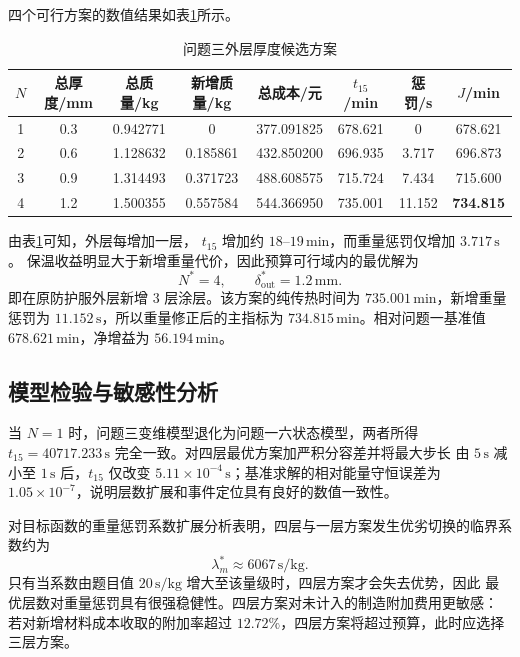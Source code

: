 \documentclass[withoutpreface,bwprint]{cumcmthesis}
\begin{document}
四个可行方案的数值结果如表\ref{tab:q3-candidates}所示。
\begin{table}[H]
    \centering
    \small
    \caption{问题三外层厚度候选方案}
    \label{tab:q3-candidates}
    \begin{tabular}{cccccccc}
        \toprule[1.5pt]
        $N$ & 总厚度/mm & 总质量/kg & 新增质量/kg
        & 总成本/元 & $t_{15}$/min & 惩罚/s & $J$/min\\
        \midrule[1pt]
        1 & 0.3 & 0.942771 & 0       & 377.091825 & 678.621 & 0     & 678.621\\
        2 & 0.6 & 1.128632 & 0.185861& 432.850200 & 696.935 & 3.717 & 696.873\\
        3 & 0.9 & 1.314493 & 0.371723& 488.608575 & 715.724 & 7.434 & 715.600\\
        4 & 1.2 & 1.500355 & 0.557584& 544.366950 & 735.001 & 11.152& \textbf{734.815}\\
        \bottomrule[1.5pt]
    \end{tabular}
\end{table}

由表\ref{tab:q3-candidates}可知，外层每增加一层，
$t_{15}$ 增加约 $18$--$19\,\mathrm{min}$，而重量惩罚仅增加 $3.717\,\mathrm{s}$。
保温收益明显大于新增重量代价，因此预算可行域内的最优解为
\begin{equation*}
    N^*=4,\qquad \delta_{\mathrm{out}}^*=1.2\,\mathrm{mm}.
\end{equation*}
即在原防护服外层新增 3 层涂层。该方案的纯传热时间为
$735.001\,\mathrm{min}$，新增重量惩罚为 $11.152\,\mathrm{s}$，所以重量修正后的主指标为
$734.815\,\mathrm{min}$。相对问题一基准值 $678.621\,\mathrm{min}$，净增益为
$56.194\,\mathrm{min}$。

\subsection{模型检验与敏感性分析}

当 $N=1$ 时，问题三变维模型退化为问题一六状态模型，两者所得
$t_{15}=40717.233\,\mathrm s$ 完全一致。对四层最优方案加严积分容差并将最大步长
由 $5\,\mathrm s$ 减小至 $1\,\mathrm s$ 后，$t_{15}$ 仅改变
$5.11\times10^{-4}\,\mathrm s$；基准求解的相对能量守恒误差为
$1.05\times10^{-7}$，说明层数扩展和事件定位具有良好的数值一致性。

对目标函数的重量惩罚系数扩展分析表明，四层与一层方案发生优劣切换的临界系数约为
\begin{equation*}
    \lambda_m^*\approx6067\,\mathrm{s/kg}.
\end{equation*}
只有当系数由题目值 $20\,\mathrm{s/kg}$ 增大至该量级时，四层方案才会失去优势，因此
最优层数对重量惩罚具有很强稳健性。四层方案对未计入的制造附加费用更敏感：
若对新增材料成本收取的附加率超过 $12.72\%$，四层方案将超过预算，此时应选择三层方案。
\end{document}

